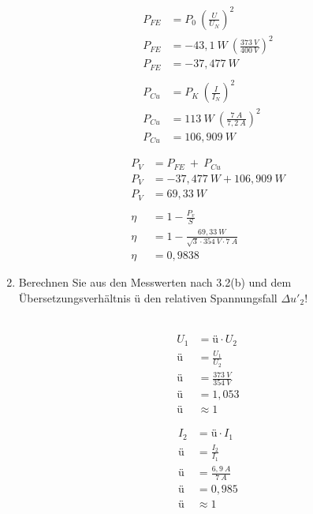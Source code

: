 \begin{enumerate}[label=\alph*)]
	      \begin{minipage}[r]{0.5\linewidth}
		      \begin{align*}
			      P_{FE} & = P_0\ (\frac{U}{U_N})^2              \\
			      P_{FE} & = -43,1\ W\ (\frac{373\ V}{400\ V})^2 \\
			      P_{FE} & = -37,477\ W
			      \\
			      \\
			      P_{Cu} & = P_K\ (\frac{I}{I_N})^2              \\
			      P_{Cu} & = 113\ W\ (\frac{7\ A}{7,2\ A})^2     \\
			      P_{Cu} & = 106,909\ W
		      \end{align*}
	      \end{minipage}
	      \begin{minipage}[l]{0.5\linewidth}
		      \begin{align*}
			      P_{V} & = P_{FE} \ +\ P_{Cu}                                  \\
			      P_{V} & = -37,477\ W + 106,909\ W                             \\
			      P_{V} & = 69,33\ W
			      \\
			      \\
			      \eta  & = 1-\frac{P_{v}}{S}                                   \\
			      \eta  & = 1- \frac{69,33\ W}{\sqrt{3}\cdot 354\ V\cdot 7\ A } \\
			      \eta  & = 0,9838
		      \end{align*}
	      \end{minipage}

	\item Berechnen Sie aus den Messwerten nach 3.2(b) und dem Übersetzungsverhältnis ü
	      den relativen Spannungsfall $\Delta u'_2$!\\ \ \\

	      \begin{minipage}[r]{0.5\linewidth}
		      \begin{align*}
			      U_1 & = ü\cdot U_2            \\
			      ü   & = \frac{U_1}{U_2}       \\
			      ü   & = \frac{373\ V}{354\ V} \\
			      ü   & = 1,053                 \\
			      ü   & \approx 1
		      \end{align*}
	      \end{minipage}
	      \begin{minipage}[l]{0.5\linewidth}
		      \begin{align*}
			      I_2 & = ü\cdot I_1          \\
			      ü   & = \frac{I_2}{I_1}     \\
			      ü   & = \frac{6,9\ A}{7\ A} \\
			      ü   & = 0,985               \\
			      ü   & \approx 1
		      \end{align*}
	      \end{minipage}


\end{enumerate}

